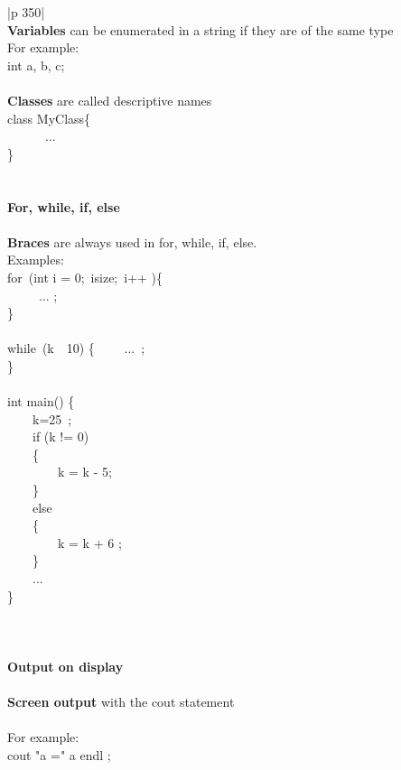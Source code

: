 \documentclass{article}
\begin{document}
\begin{tabular}{ |p {350}| }
\hline \\
\textbf{Variables} can be enumerated in a string if they are of the same type\\
For example: \\
int a, b, c;\\\\ 
\textbf{Classes} are called descriptive names\\
class MyClass\{\\
\ \ \ \ \ \ ... \\
\} \\ \\
\hline \\
\textbf{\Large {For, while, if, else}}\\ \\
\textbf{Braces} are always used in for, while, if, else.\\
Examples:\\
for\ (int i = 0;\ i\leq size;\ i++ )\{ \\
\ \ \ \ \ ... ;\\
\} \\ \\
while\ (k\ \leq\ 10) 
\{
\ \ \ \ ...\ ;\\
\} \\ \\ 
int main()
\{\\
\ \ \ \ k=25\ ;\\
\ \ \ \ if (k != 0) \\
\ \ \ \ \{\\
\ \ \ \ \ \ \ \ k = k - 5;\\
\ \ \ \ \}\\
\ \ \ \ else\\
\ \ \ \ \{\\
\ \ \ \ \ \ \ \ k = k + 6 ;\\
\ \ \ \ \}\\
\ \ \ \ ... \\
\} \\ \\




\\ \hline \\

\textbf{\Large {Output on display}}\\ \\
\textbf{Screen output} with the cout statement \\ \\
For example:\\
cout \ll "a =" \ll a \ll endl ;\\ \\
\hline 
\end{tabular}\\ \\ \\ 
\end{document}
